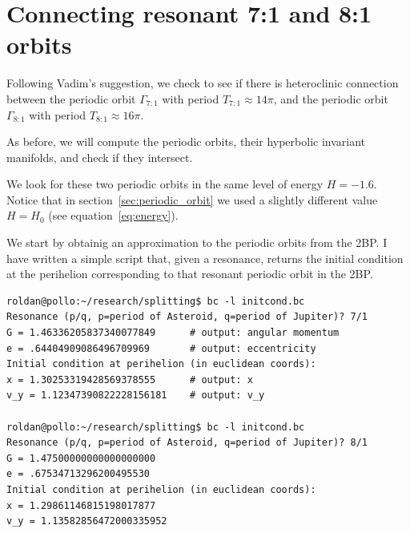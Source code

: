 \documentclass[a4paper]{amsart}
\theoremstyle{remark}
\begin{document}

\section{Connecting resonant 7:1 and 8:1 orbits}

Following Vadim's suggestion, we check to see if there is heteroclinic
connection between the periodic orbit $\Gamma_{7:1}$ with period
$T_{7:1}\approx 14\pi$, and the periodic orbit $\Gamma_{8:1}$ with period
$T_{8:1}\approx 16\pi$.

As before, we will compute the periodic orbits, their hyperbolic
invariant manifolds, and check if they intersect.

We look for these two periodic orbits in the same level of energy
$H=-1.6$. 
Notice that in section~\ref{sec:periodic_orbit} we used a slightly
different value $H=H_0$ (see equation~\eqref{eq:energy}).

We start by obtainig an approximation to the periodic orbits from the
2BP. I have written a simple script that, given a resonance, returns the
initial condition at the perihelion corresponding to that resonant periodic
orbit in the 2BP.

\begin{verbatim}
roldan@pollo:~/research/splitting$ bc -l initcond.bc 
Resonance (p/q, p=period of Asteroid, q=period of Jupiter)? 7/1
G = 1.46336205837340077849      # output: angular momentum
e = .64404909086496709969       # output: eccentricity
Initial condition at perihelion (in euclidean coords):
x = 1.30253319428569378555      # output: x
v_y = 1.12347390822228156181    # output: v_y

roldan@pollo:~/research/splitting$ bc -l initcond.bc 
Resonance (p/q, p=period of Asteroid, q=period of Jupiter)? 8/1
G = 1.47500000000000000000
e = .67534713296200495530
Initial condition at perihelion (in euclidean coords):
x = 1.29861146815198017877
v_y = 1.13582856472000335952
\end{verbatim}
\end{document}
